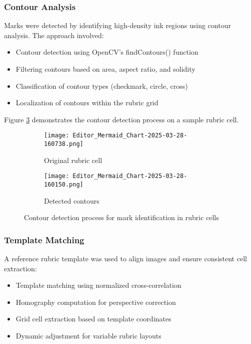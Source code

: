 \documentclass[12pt]{article}
\begin{document}
\subsubsection{Contour Analysis}
Marks were detected by identifying high-density ink regions using contour analysis. The approach involved:
\begin{itemize}
    \item Contour detection using OpenCV's findContours() function
    \item Filtering contours based on area, aspect ratio, and solidity
    \item Classification of contour types (checkmark, circle, cross)
    \item Localization of contours within the rubric grid
\end{itemize}

Figure \ref{fig:contour_analysis} demonstrates the contour detection process on a sample rubric cell.

\begin{figure}[H]
    \centering
    \begin{subfigure}{.45\textwidth}
        \centering
        \texttt{[image: Editor\_Mermaid\_Chart-2025-03-28-160738.png]}
        \caption{Original rubric cell}
        \label{fig:sub1}
    \end{subfigure}
    \hfill
    \begin{subfigure}{.45\textwidth}
        \centering
        \texttt{[image: Editor\_Mermaid\_Chart-2025-03-28-160150.png]}
        \caption{Detected contours}
        \label{fig:sub2}
    \end{subfigure}
    \caption{Contour detection process for mark identification in rubric cells}
    \label{fig:contour_analysis}
\end{figure}

\subsubsection{Template Matching}
A reference rubric template was used to align images and ensure consistent cell extraction:
\begin{itemize}
    \item Template matching using normalized cross-correlation
    \item Homography computation for perspective correction
    \item Grid cell extraction based on template coordinates
    \item Dynamic adjustment for variable rubric layouts
\end{itemize}
\end{document}
